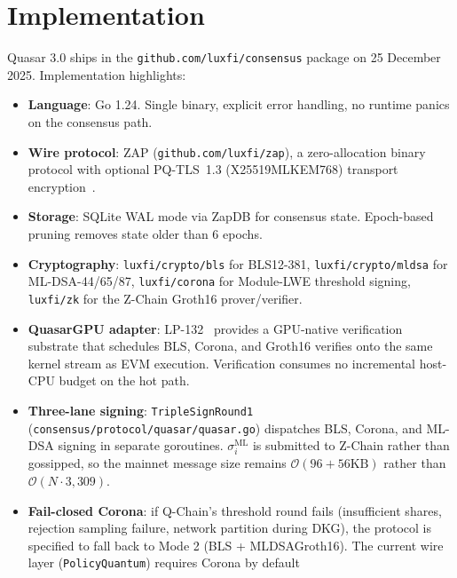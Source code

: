 \section{Implementation}

\label{sec:implementation}

Quasar 3.0 ships in the \texttt{github.com/luxfi/consensus} package on
25 December 2025. Implementation highlights:

\begin{itemize}[leftmargin=2em,nosep]
\item \textbf{Language}: Go 1.24. Single binary, explicit error handling,
      no runtime panics on the consensus path.
\item \textbf{Wire protocol}: ZAP (\texttt{github.com/luxfi/zap}), a
      zero-allocation binary protocol with optional PQ-TLS~1.3
      (X25519MLKEM768) transport encryption~\cite{lux-zap}.
\item \textbf{Storage}: SQLite WAL mode via ZapDB for consensus state.
      Epoch-based pruning removes state older than 6 epochs.
\item \textbf{Cryptography}: \texttt{luxfi/crypto/bls} for BLS12-381,
      \texttt{luxfi/crypto/mldsa} for ML-DSA-44/65/87,
      \texttt{luxfi/corona} for Module-LWE threshold signing,
      \texttt{luxfi/zk} for the Z-Chain Groth16 prover/verifier.
\item \textbf{QuasarGPU adapter}: LP-132~\cite{lp132-quasargpu} provides
      a GPU-native verification substrate that schedules BLS, Corona,
      and Groth16 verifies onto the same kernel stream as EVM execution.
      Verification consumes no incremental host-CPU budget on the hot
      path.
\item \textbf{Three-lane signing}: \texttt{TripleSignRound1}
      (\texttt{consensus/protocol/quasar/quasar.go}) dispatches
      BLS, Corona, and ML-DSA signing in separate goroutines.
      $\sigma_i^{\mathrm{ML}}$ is submitted to Z-Chain rather than
      gossipped, so the mainnet message size remains
      $\mathcal{O}(96 + 56\text{KB})$ rather than
      $\mathcal{O}(N \cdot 3{,}309)$.
\item \textbf{Fail-closed Corona}: if Q-Chain's threshold round fails
      (insufficient shares, rejection sampling failure, network
      partition during DKG), the protocol is specified to fall back to
      Mode 2 (BLS + MLDSAGroth16). The current wire layer
      (\texttt{PolicyQuantum}) requires Corona by default

\end{itemize}
